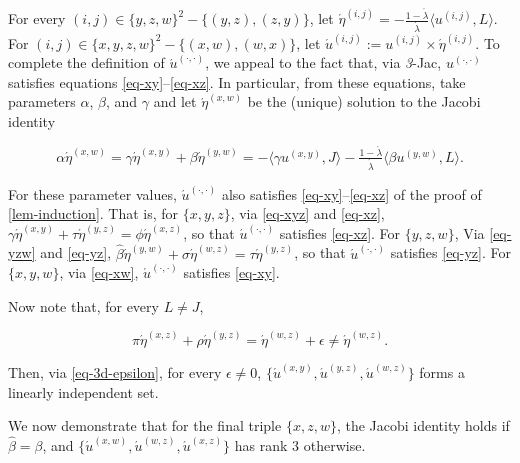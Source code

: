 \documentclass[ecta,nameyear,draft]{econsocart}
\newcommand{\bs}{-}%
\renewcommand{\ij}{{(i, j)}}
\newcommand{\xy}{{(x, y)}}
\newcommand{\yz}{{(y,z)}}
\newcommand{\xz}{{(x,z)}}
\newcommand{\xw}{{(x,w)}}
\newcommand{\yw}{{(y,w)}}
\newcommand{\wz}{(w,z)}
\newcommand{\dd}{{(\cdot,\cdot)}}
\newcommand{\threejac}{\textup{\textit{3}-Jac}}
\theoremstyle{plain}
\theoremstyle{remark}
\begin{document}
\begin{appendix}
  For every $(i, j) \in \{y,z,w\}^2 \bs \{(y, z), (z, y)\}$, let
  $\acute{\eta}^{\ij} = - \frac{1 - \acute{\lambda}}{\acute{\lambda}} \langle
  u^{\ij}, L \rangle$.  For $(i, j) \in \{x, y , z, w\}^2 \bs \{(x, w), (w,
  x)\}$, let $\acute{u}^{\ij}:= u^{\ij} \times \acute{\eta}^{\ij}$.  To
  complete the definition of $\acute{u}^{\dd}$, we appeal to the fact that, via
  \threejac, $u^{\dd}$ satisfies equations \eqref{eq-xy}--\eqref{eq-xz}. In
  particular, from these equations, take parameters $\alpha$, $\beta$, and
  $\gamma$ and let $\acute{\eta}^{\xw}$ be the (unique) solution to the Jacobi
  identity
  \begin{linenomath*}
    \begin{equation}\label{eq-xw}
      \alpha \acute{\eta}^{\xw} = \gamma \acute{\eta}^{\xy} + \beta
      \acute{\eta}^{\yw} = -\langle \gamma u^{\xy} , J \rangle -
      \tfrac{1-\acute{\lambda}}{\acute{\lambda}}\langle\beta u^{\yw}, L
      \rangle.
    \end{equation}
  \end{linenomath*}
  For these parameter values, $\acute{u}^{\dd}$ also satisfies
  \eqref{eq-xy}--\eqref{eq-xz} of the proof of \cref{lem-induction}. That is,
  for $\{x,y,z\}$, via \cref{eq-xyz} and \eqref{eq-xz}, $\gamma
  \acute{\eta}^{\xy}+\tau \acute{\eta}^{\yz} = \phi \acute{\eta}^{\xz}$, so
  that $\acute{u}^{\dd}$ satisfies \eqref{eq-xz}. For $\{y,z,w\}$, Via
  \cref{eq-yzw} and \eqref{eq-yz}, $\hat{\beta} \acute{\eta}^{\yw}+\sigma
  \acute{\eta}^{\wz} = \tau \acute{\eta}^{\yz}$, so that $\acute{u}^{\dd}$
  satisfies \eqref{eq-yz}. For $\{x,y,w\}$, via \cref{eq-xw}, $\acute{u}^{\dd}$
  satisfies \eqref{eq-xy}.

  Now note that, for every $L \neq J$,
  \begin{linenomath*}
    \begin{equation}\label{eq-3d-epsilon}
      \pi \acute{\eta}^{\xz} + \rho \acute{\eta}^{\yz} = \acute{\eta}^{\wz} +
      \epsilon \neq \acute{\eta}^{\wz}.
    \end{equation}
  \end{linenomath*}
  Then, via \eqref{eq-3d-epsilon}, for every $\epsilon\neq 0$,
  $\{\acute{u}^{\xy}, \acute{u}^{\yz}, \acute{u}^{\wz}\}$ forms a linearly
  independent set.

  We now demonstrate that for the final triple $\{x,z,w\}$, the Jacobi identity
  holds if $\hat{\beta} = \beta$, and
  $\{\acute{u}^{\xw},\acute{u}^{\wz},\acute{u}^{\xz}\}$ has rank $3$ otherwise.


\end{appendix}
\end{document}
